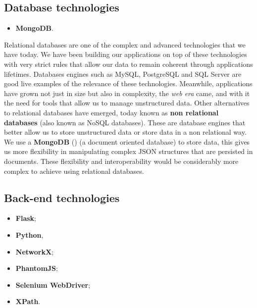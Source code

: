 \subsection{Database technologies}
\begin{itemize}
    \item \textbf{MongoDB}.
\end{itemize}

Relational databases are one of the complex and advanced technologies that we have today. We have been building our applications on top of these technologies with very strict rules that allow our data to remain coherent through applications lifetimes. Databases engines such as MySQL, PostgreSQL and SQL Server are good live examples of the relevance of these technologies. Meanwhile, applications have grown not just in size but also in complexity, the \textit{web era} came, and with it the need for tools that allow us to manage unstructured data. Other alternatives to relational databases have emerged, today known as \textbf{non relational databases} (also known as NoSQL databases). These are database engines that better allow us to store unstructured data or store data in a non relational way.\\
\indent We use a \textbf{MongoDB} (\cite{mongodb}) (a document oriented database) to store data, this gives us more flexibility in manipulating complex JSON structures that are persisted in documents. These flexibility and interoperability would be considerably more complex to achieve using relational databases.

\subsection{Back-end technologies}
\begin{itemize}
    \item \textbf{Flask};
    \item \textbf{Python},
    \item \textbf{NetworkX};
    \item \textbf{PhantomJS};
    \item \textbf{Selenium WebDriver};
    \item \textbf{XPath}.
\end{itemize}

